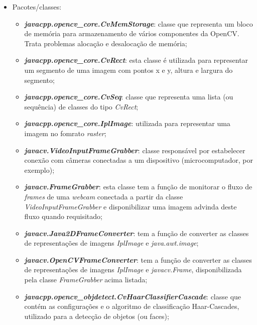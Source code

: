\begin{itemize}
	\item Pacotes/classes:
	\begin{itemize}
		\item \textit{\textbf{javacpp.opencv\_core.CvMemStorage}}: classe que representa um bloco de memória para armazenamento de vários componentes da OpenCV. Trata problemas alocação e desalocação de memória;
		
		\item \textbf{\textit{javacpp.opencv\_core.CvRect}}: esta classe é utilizada para representar um segmento de uma imagem com pontos x e y, altura e largura do segmento;
		
		\item \textbf{\textit{javacpp.opencv\_core.CvSeq}}: classe que representa uma lista (ou sequência) de classes do tipo \textit{CvRect};
		
		\item \textbf{\textit{javacpp.opencv\_core.IplImage}}: utilizada para representar uma imagem no fomrato \textit{raster};
		
		\item \textbf{\textit{javacv.VideoInputFrameGrabber}}:	classe responsável por estabelecer conexão com câmeras conectadas a um dispositivo (microcomputador, por exemplo);

		\item \textbf{\textit{javacv.FrameGrabber}}: esta classe tem a função de monitorar o fluxo de \textit{frames} de uma \textit{webcam} conectada a partir da classe \textit{VideoInputFrameGrabber} e disponibilizar uma imagem advinda deste fluxo quando requisitado;		
			
		\item \textbf{\textit{javacv.Java2DFrameConverter}}: tem a função de converter as classes de representações de imagens \textit{IplImage} e \textit{java.awt.image};
		
		\item \textbf{\textit{javacv.OpenCVFrameConverter}}: tem a função de converter as classes de representações de imagens \textit{IplImage} e \textit{javacv.Frame}, disponibilizada pela classe \textit{FrameGrabber} acima listada;
		
		\item \textbf{\textit{javacpp.opencv\_objdetect.CvHaarClassifierCascade}}: classe que contém as configurações e o algoritmo de classificação Haar-Cascades, utilizado para a detecção de objetos (ou faces);
	\end{itemize}


\end{itemize}
